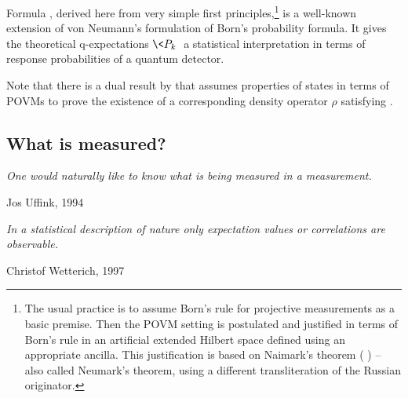 \documentclass[12pt]{article}
\begin{document}
Formula , derived here from very simple first
principles,\footnote{\label{f.3}
The usual practice is to assume Born's rule for projective measurements
as a basic premise. Then the POVM setting is postulated and justified in
terms of Born's rule in an artificial extended  Hilbert space defined
using an appropriate ancilla. This justification is based on Naimark's
theorem ( \cite{Nai}) -- also called Neumark's theorem,
using a different transliteration of the Russian originator.
} %
is a well-known extension of von Neumann's formulation of Born's
probability formula. It gives the theoretical q-expectations $\<P_k\>$ a
statistical interpretation in terms of response probabilities of a
quantum detector.


Note that there is a dual result by  \cite{Bus} that assumes
properties of states in terms of POVMs to prove the existence of a
corresponding density operator $\rho$ satisfying .



\subsection{What is measured?}\label{ss.meas}

\nopagebreak
\hfill\parbox[t]{10.8cm}{\footnotesize

{\em
One would naturally like to know what is being measured in a
measurement.}

\hfill Jos Uffink, 1994 \cite[p.205]{Uff1994}
}

\bigskip

\nopagebreak
\hfill\parbox[t]{10.8cm}{\footnotesize

{\em In a statistical description of nature only expectation values
or correlations are observable.
}

\hfill Christof Wetterich, 1997 \cite{Wet}
}
\bigskip
\end{document}
